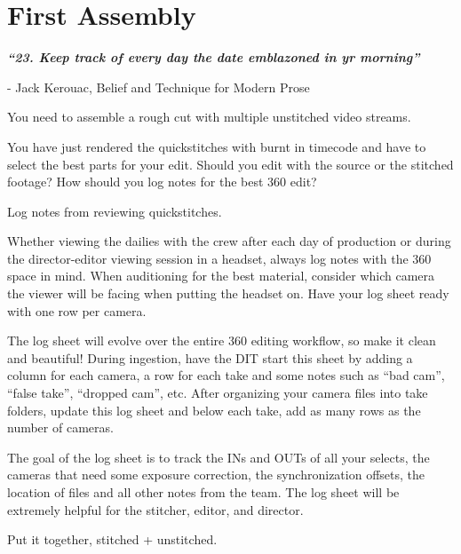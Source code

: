 \chapter{First Assembly}
\pagecolor{white}
\label{chap:31}
\begin{fullwidth}

{\itshape\bfseries “23. Keep track of every day the date emblazoned in yr morning”}

- Jack Kerouac, Belief and Technique for Modern Prose
\vspace{\baselineskip}

\problem

{\large You need to assemble a rough cut with multiple unstitched video streams. \par}

You have just rendered the quickstitches with burnt in timecode and have to select the best parts for your edit. Should you edit with the source or the stitched footage? How should you log notes for the best 360 edit?

\solution

{\large Log notes from reviewing quickstitches. \par}

Whether viewing the dailies with the crew after each day of production or during the director-editor viewing session in a headset, always log notes with the 360 space in mind. When auditioning for the best material, consider which camera the viewer will be facing when putting the headset on. Have your log sheet ready with one row per camera. 


The log sheet will evolve over the entire 360 editing workflow, so make it clean and beautiful! During ingestion, have the DIT start this sheet by adding a column for each camera, a row for each take and some notes such as “bad cam”, “false take”, “dropped cam”, etc. After organizing your camera files into take folders, update this log sheet and below each take, add as many rows as the number of cameras.


The goal of the log sheet is to track the INs and OUTs of all your selects, the cameras that need some exposure correction, the synchronization offsets, the location of files and all other notes from the team. The log sheet will be extremely helpful for the stitcher, editor, and director.

{\large Put it together, stitched + unstitched. \par}


\end{fullwidth}
